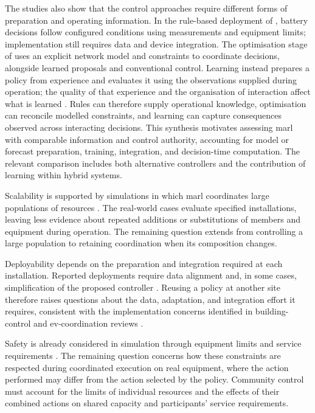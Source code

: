 The studies also show that the control approaches require different forms of preparation and operating information. In the rule-based deployment of \textcite{patricio2026recmas}, battery decisions follow configured conditions using measurements and equipment limits; implementation still requires data and device integration. The optimisation stage of \textcite{recP01} uses an explicit network model and constraints to coordinate decisions, alongside learned proposals and conventional control. Learning instead prepares a policy from experience and evaluates it using the observations supplied during operation; the quality of that experience and the organisation of interaction affect what is learned \parencite{nweye2022realworld,savino2025attention}. Rules can therefore supply operational knowledge, optimisation can reconcile modelled constraints, and learning can capture consequences observed across interacting decisions. This synthesis motivates assessing \gls{marl} with comparable information and control authority, accounting for model or forecast preparation, training, integration, and decision-time computation. The relevant comparison includes both alternative controllers and the contribution of learning within hybrid systems.

Scalability is supported by simulations in which \gls{marl} coordinates large populations of resources \parencite{charbonnier2022scalable,savino2025attention,mai2024demandresponse,recN19}. The real-world cases evaluate specified installations, leaving less evidence about repeated additions or substitutions of members and equipment during operation. The remaining question extends from controlling a large population to retaining coordination when its composition changes.

Deployability depends on the preparation and integration required at each installation. Reported deployments require data alignment and, in some cases, simplification of the proposed controller \parencite{hosseini2026cirlem,recP02}. Reusing a policy at another site therefore raises questions about the data, adaptation, and integration effort it requires, consistent with the implementation concerns identified in building-control and \gls{ev}-coordination reviews \parencite{recV03,recV04}.

Safety is already considered in simulation through equipment limits and service requirements \parencite{recS32,wilk2024smartcommunity,recC13}. The remaining question concerns how these constraints are respected during coordinated execution on real equipment, where the action performed may differ from the action selected by the policy. Community control must account for the limits of individual resources and the effects of their combined actions on shared capacity and participants' service requirements.

